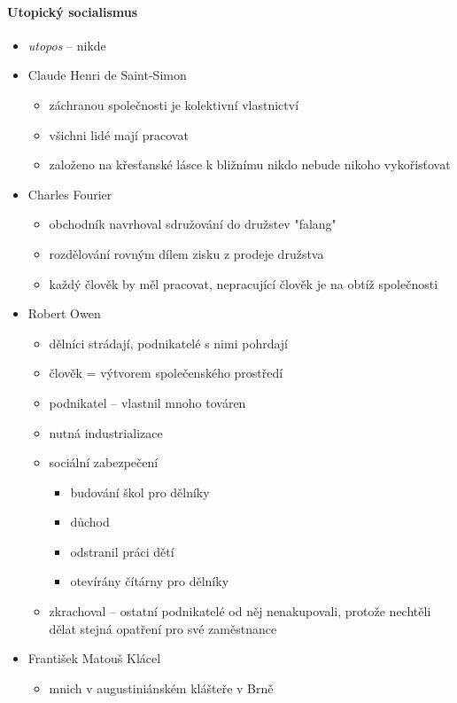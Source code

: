 \paragraph{Utopický socialismus}
\begin{itemize}
\item \textit{utopos} -- nikde
\item Claude Henri de Saint-Simon
	\begin{itemize}
	\item záchranou společnosti je kolektivní vlastnictví
	\item všichni lidé mají pracovat
	\item založeno na křesťanské lásce k bližnímu \ra nikdo nebude nikoho vykořisťovat
	\end{itemize}
\item Charles Fourier
	\begin{itemize}
	\item obchodník \ra navrhoval sdružování do družstev "falang"
	\item rozdělování rovným dílem zisku z prodeje družstva
	\item každý člověk by měl pracovat, nepracující člověk je na obtíž společnosti
	\end{itemize}
\item Robert Owen 
	\begin{itemize}
	\item dělníci strádají, podnikatelé s nimi pohrdají
	\item člověk = výtvorem společenského prostředí
	\item podnikatel -- vlastnil mnoho továren
	\item nutná industrializace
	\item sociální zabezpečení 
		\begin{itemize}
		\item budování škol pro dělníky
		\item důchod
		\item odstranil práci dětí
		\item otevírány čítárny pro dělníky
		\end{itemize}
	\item zkrachoval -- ostatní podnikatelé od něj nenakupovali, protože nechtěli dělat stejná opatření pro své zaměstnance
	\end{itemize}
\item František Matouš Klácel
	\begin{itemize}
	\item mnich v augustiniánském klášteře v Brně

\end{itemize}
\end{itemize}
